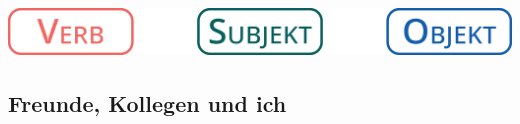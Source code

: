 \begin{multicols}{3}
    
                    \includegraphics[width=.9\linewidth]{figures/dieSatzfrage.eps}
                    \label{fig:languages:deutsch:dieSatzfrage}
    
            \end{multicols}

    \subsection{Freunde, Kollegen und ich}\label{subsection:deutsch:freundekollegenich}


